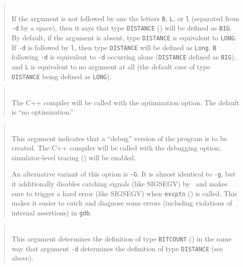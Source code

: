 \begin{quote}
\noindent{}\\ \hspace{0in}
If the argument is not followed by one the letters {\tt B}, {\tt L}, or
{\tt l} (separated from {\tt -d} by a space), then it says that
type {\tt DISTANCE} () will be defined as {\tt BIG}.
By default, if the argument is absent, type {\tt DISTANCE} is equivalent to
{\tt LONG}.
If {\tt -d} is followed by {\tt l}, then type {\tt DISTANCE} will be defined
as {\tt Long}.
{\tt B} following {\tt -d} is equivalent to {\tt -d} occurring alone
({\tt DISTANCE} defined as {\tt BIG}), and {\tt L} is
equivalent to no argument at all (the default case of type {\tt DISTANCE}
being defined as {\tt LONG}).
\end{quote}

\begin{quote}
\noindent{}\\ \hspace{0in}
The C++ compiler will be called with the optimization option.
The default is ``no optimization.''
\end{quote}

\begin{quote}
\noindent{}\\ \hspace{0in}
This argument indicates that a ``debug'' version of the program is to be
created.
The C++ compiler will be called with the debugging option;
simulator-level tracing () will be enabled.

\noindent
An alternative variant of this option is {\tt -G}.
It is almost identical to {\tt -g}, but it additionally disables catching 
signals (like SIGSEGV) by \smurph\ and makes sure to trigger a hard error
(like SIGSEGV) when {\tt excptn} () is called.
This makes it easier to catch and diagnose some errors (including violations
of internal assertions) in {\tt gdb}.
\end{quote}

\begin{quote}
\noindent{}\\ \hspace{0in}
This argument determines the definition of type {\tt BITCOUNT}
() in the same way that argument {\tt -d} determines the
definition of type {\tt DISTANCE} (see above).
\end{quote}

